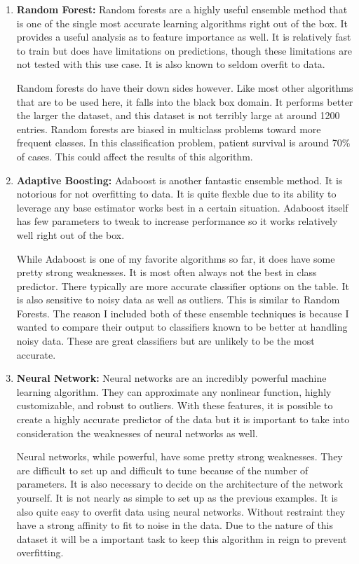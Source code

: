 \documentclass[11pt]{article}
\begin{document}
\begin{enumerate}
	\item \textbf{Random Forest:} Random forests are a highly useful ensemble method that is one of the single most accurate learning algorithms right out of the box. It provides a useful analysis as to feature importance as well. It is relatively fast to train but does have limitations on predictions, though these limitations are not tested with this use case. It is also known to seldom overfit to data.
	
	Random forests do have their down sides however. Like most other algorithms that are to be used here, it falls into the black box domain. It performs better the larger the dataset, and this dataset is not terribly large at around 1200 entries. Random forests are biased in multiclass problems toward more frequent classes. In this classification problem, patient survival is around 70\% of cases. This could affect the results of this algorithm.
	
	\item \textbf{Adaptive Boosting:} Adaboost is another fantastic ensemble method. It is notorious for not overfitting to data. It is quite flexble due to its ability to leverage any base estimator works best in a certain situation. Adaboost itself has few parameters to tweak to increase performance so it works relatively well right out of the box.
	
	While Adaboost is one of my favorite algorithms so far, it does have some pretty strong weaknesses. It is most often always not the best in class predictor. There typically are more accurate classifier options on the table. It is also sensitive to noisy data as well as outliers. This is similar to Random Forests. The reason I included both of these ensemble techniques is because I wanted to compare their output to classifiers known to be better at handling noisy data. These are great classifiers but are unlikely to be the most accurate.
	
	\item \textbf{Neural Network:} Neural networks are an incredibly powerful machine learning algorithm. They can approximate any nonlinear function, highly customizable, and robust to outliers. With these features, it is possible to create a highly accurate predictor of the data but it is important to take into consideration the weaknesses of neural networks as well.
	
	Neural networks, while powerful, have some pretty strong weaknesses. They are difficult to set up and difficult to tune because of the number of parameters. It is also necessary to decide on the architecture of the network yourself. It is not nearly as simple to set up as the previous examples. It is also quite easy to overfit data using neural networks. Without restraint they have a strong affinity to fit to noise in the data. Due to the nature of this dataset it will be a important task to keep this algorithm in reign to prevent overfitting.
	

\end{enumerate}
\end{document}
